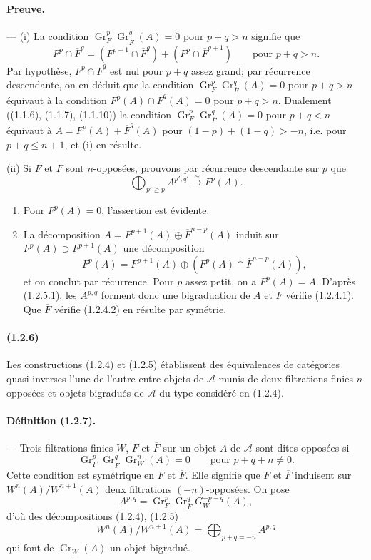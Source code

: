 \documentclass[10pt]{article}
\newcommand{\Gr}{\operatorname{Gr}}
\newcommand{\calA}{\mathcal A}
\newcommand{\iso}{\xrightarrow{\sim}}
\begin{document}
\paragraph{Preuve.} --- (i) La condition $\Gr_F^p\Gr_{\overline F}^q(A)=0$ pour $p+q>n$ signifie que
\[
F^p\cap\overline F^q=(F^{p+1}\cap\overline F^q)+(F^p\cap\overline F^{q+1})\qquad\text{pour }p+q>n.
\]
Par hypothèse, $F^p\cap\overline F^q$ est nul pour $p+q$ assez grand; par récurrence descendante, on en déduit que la condition $\Gr_F^p\Gr_{\overline F}^q(A)=0$ pour $p+q>n$ équivaut à la condition $F^p(A)\cap\overline F^q(A)=0$ pour $p+q>n$. Dualement ((1.1.6), (1.1.7), (1.1.10)) la condition $\Gr_F^p\Gr_{\overline F}^q(A)=0$ pour $p+q<n$ équivaut à $A=F^p(A)+\overline F^q(A)$ pour $(1-p)+(1-q)>-n$, i.e. pour $p+q\le n+1$, et (i) en résulte.

(ii) Si $F$ et $\overline F$ sont $n$-opposées, prouvons par récurrence descendante sur $p$ que
\[
\tag{1.2.5.1}
\bigoplus_{p'\ge p} A^{p',q'}\iso F^p(A).
\]
\begin{enumerate}[label=\alph*)]
\item Pour $F^p(A)=0$, l'assertion est évidente.
\item La décomposition $A=F^{p+1}(A)\oplus\overline F^{n-p}(A)$ induit sur $F^p(A)\supset F^{p+1}(A)$ une décomposition
\[
F^p(A)=F^{p+1}(A)\oplus(F^p(A)\cap\overline F^{n-p}(A)),
\]
et on conclut par récurrence. Pour $p$ assez petit, on a $F^p(A)=A$. D'après (1.2.5.1), les $A^{p,q}$ forment donc une bigraduation de $A$ et $F$ vérifie (1.2.4.1). Que $\overline F$ vérifie (1.2.4.2) en résulte par symétrie.
\end{enumerate}

\paragraph{(1.2.6)} Les constructions (1.2.4) et (1.2.5) établissent des équivalences de catégories quasi-inverses l'une de l'autre entre objets de $\calA$ munis de deux filtrations finies $n$-opposées et objets bigradués de $\calA$ du type considéré en (1.2.4).

\paragraph{Définition (1.2.7).} --- Trois filtrations finies $W$, $F$ et $\overline F$ sur un objet $A$ de $\calA$ sont dites opposées si
\[
\Gr_F^p\Gr_{\overline F}^{q}\Gr_W^n(A)=0\qquad\text{pour }p+q+n\ne0.
\]
Cette condition est symétrique en $F$ et $\overline F$. Elle signifie que $F$ et $\overline F$ induisent sur $W^n(A)/W^{n+1}(A)$ deux filtrations $(-n)$-opposées. On pose
\[
A^{p,q}=\Gr_F^p\Gr_{\overline F}^{q}G_W^{-p-q}(A),
\]
d'où des décompositions (1.2.4), (1.2.5)
\[
\tag{1.2.7.1}
W^n(A)/W^{n+1}(A)=\bigoplus_{p+q=-n}A^{p,q}
\]
qui font de $\Gr_W(A)$ un objet bigradué.
\end{document}
